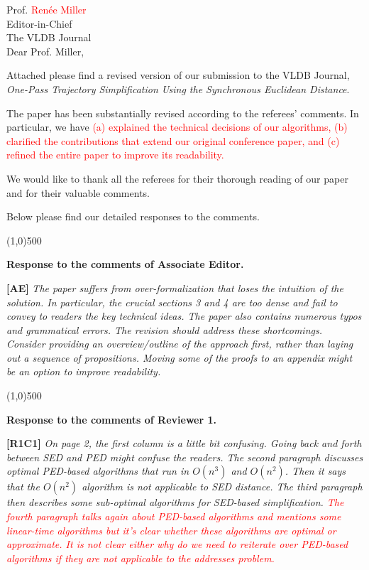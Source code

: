 \documentclass{letter}
\newcommand{\marked}[1]{\textcolor{red}{#1}}
\begin{document}
Prof. \marked{Renée Miller} \\
Editor-in-Chief		\\
The VLDB Journal	\\



Dear Prof. Miller,

Attached please find a revised version of our submission to
the VLDB Journal, \emph{One-Pass Trajectory Simplification Using the Synchronous Euclidean Distance}.


The paper has been substantially revised according to the referees' comments. In particular, we have \marked{ (a) explained the technical decisions of our algorithms, (b) clarified the contributions that extend our original conference paper, and (c) refined the entire paper to improve its readability.}

We would like to thank all the referees for their thorough reading of our paper and for their valuable comments.

Below please find our detailed responses to the comments.


\line(1,0){500}

\textbf{Response to the comments of Associate Editor.}

\textbf{[AE]} \emph{The paper suffers from over-formalization that loses the intuition of the solution. In particular, the crucial sections 3 and 4 are too dense and fail to convey to readers the key technical ideas. The paper also contains numerous typos and grammatical errors. The revision should address these shortcomings. Consider providing an overview/outline of the approach first, rather than laying out a sequence of propositions. Moving some of the proofs to an appendix might be an option to improve readability. }




\line(1,0){500}

\textbf{Response to the comments of Reviewer 1.}

\textbf{[R1C1]} \emph{On page 2, the first column is a little bit confusing. Going back and forth between SED and PED might confuse the readers. The second paragraph discusses optimal PED-based algorithms that run in $O(n^3)$ and $O(n^2)$. Then it says that the $O(n^2)$ algorithm is not applicable to SED distance. The third paragraph then describes some sub-optimal algorithms for SED-based simplification. \marked{The fourth paragraph talks again about PED-based algorithms and mentions some linear-time algorithms but it's clear whether these algorithms are optimal or approximate. It is not clear either why do we need to reiterate over PED-based algorithms if they are not applicable to the addresses problem.}}
\end{document}
